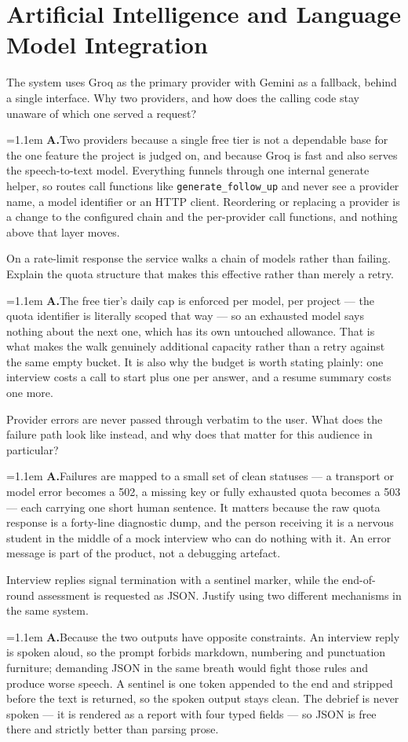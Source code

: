 \documentclass[11pt,a4paper]{article}
\newcommand{\code}[1]{\texttt{\small #1}}
\newcommand{\ans}[1]{%
  \par\vspace{0.32em}%
  \begingroup
  \small\color{answerink}%
  \leftskip=1.1em
  \noindent\textbf{\color{accent}A.}\hspace{0.45em}#1\par
  \endgroup
  \vspace{0.1em}%
}
\begin{document}
\section{Artificial Intelligence and Language Model Integration}
\begin{questions}[resume]

\item The system uses Groq as the primary provider with Gemini as a fallback,
behind a single interface. Why two providers, and how does the calling code stay
unaware of which one served a request?
\ans{Two providers because a single free tier is not a dependable base for the
one feature the project is judged on, and because Groq is fast and also serves
the speech-to-text model. Everything funnels through one internal generate
helper, so routes call functions like \code{generate\_follow\_up} and never see a
provider name, a model identifier or an HTTP client. Reordering or replacing a
provider is a change to the configured chain and the per-provider call functions,
and nothing above that layer moves.}

\item On a rate-limit response the service walks a chain of models rather than
failing. Explain the quota structure that makes this effective rather than merely
a retry.
\ans{The free tier's daily cap is enforced per model, per project --- the quota
identifier is literally scoped that way --- so an exhausted model says nothing
about the next one, which has its own untouched allowance. That is what makes the
walk genuinely additional capacity rather than a retry against the same empty
bucket. It is also why the budget is worth stating plainly: one interview costs a
call to start plus one per answer, and a resume summary costs one more.}

\item Provider errors are never passed through verbatim to the user. What does the
failure path look like instead, and why does that matter for this audience in
particular?
\ans{Failures are mapped to a small set of clean statuses --- a transport or model
error becomes a 502, a missing key or fully exhausted quota becomes a 503 --- each
carrying one short human sentence. It matters because the raw quota response is a
forty-line diagnostic dump, and the person receiving it is a nervous student in
the middle of a mock interview who can do nothing with it. An error message is
part of the product, not a debugging artefact.}

\item Interview replies signal termination with a sentinel marker, while the
end-of-round assessment is requested as JSON. Justify using two different
mechanisms in the same system.
\ans{Because the two outputs have opposite constraints. An interview reply is
spoken aloud, so the prompt forbids markdown, numbering and punctuation
furniture; demanding JSON in the same breath would fight those rules and produce
worse speech. A sentinel is one token appended to the end and stripped before the
text is returned, so the spoken output stays clean. The debrief is never spoken
--- it is rendered as a report with four typed fields --- so JSON is free there and
strictly better than parsing prose.}


\end{questions}
\end{document}
